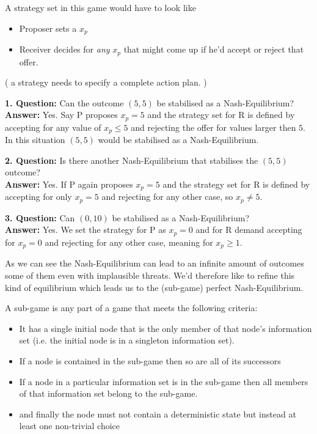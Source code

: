 \begin{example}
	A strategy set in this game would have to look like
	\begin{itemize}
		\item Proposer sets a $x_{p}$
		\item Receiver decides for \textit{any} $x_{p}$ that might come up if he'd accept or reject that offer.
	\end{itemize}
	\begin{center}( a strategy needs to specify a complete action plan. ) \end{center}
	
	
	\textbf{1. Question:} Can the outcome $(5, 5)$ be stabilised as a Nash-Equilibrium? \\
	\textbf{Answer:} Yes. Say P proposes $x_{p} = 5$ and the strategy set for R is defined by accepting for any value of $x_{p} \leq 5$ and rejecting the offer for values larger then $5$. \\
		In this situation $(5, 5)$ would be stabilised as a Nash-Equilibrium.


	\textbf{2. Question:} Is there another Nash-Equilibrium that stabilises the $(5, 5)$ outcome? \\
	\textbf{Answer:} Yes. If P again proposes $x_{p} = 5$ and the strategy set for R is defined by accepting for only $x_{p} = 5$ and rejecting for any other case, so $x_{p} \neq 5$. 
	
	
	\textbf{3. Question:} Can $(0, 10)$ be stabilised as a Nash-Equilibrium? \\
	\textbf{Answer:} Yes. We set the strategy for P as $x_{p} = 0$ and for R demand accepting for $x_{p} = 0$ and rejecting for any other case, meaning for $x_{p} \geq 1$. 
\end{example}

As we can see the Nash-Equilibrium can lead to an infinite amount of outcomes some of them even with implausible threats. We'd therefore like to refine this kind of equilibrium which leads us to the (sub-game) perfect Nash-Equilibrium.

\begin{definition} 
	A sub-game is any part of a game that meets the following criteria:
	\begin{itemize}
		\item It has a single initial node that is the only member of that node's information set (i.e. the initial node is in a singleton information set).
		\item If a node is contained in the sub-game then so are all of its successors
		\item If a node in a particular information set is in the sub-game then all members of that information set belong to the sub-game.
		\item and finally the node must not contain a deterministic state but instead at least one non-trivial choice
	\end{itemize}
\end{definition}

